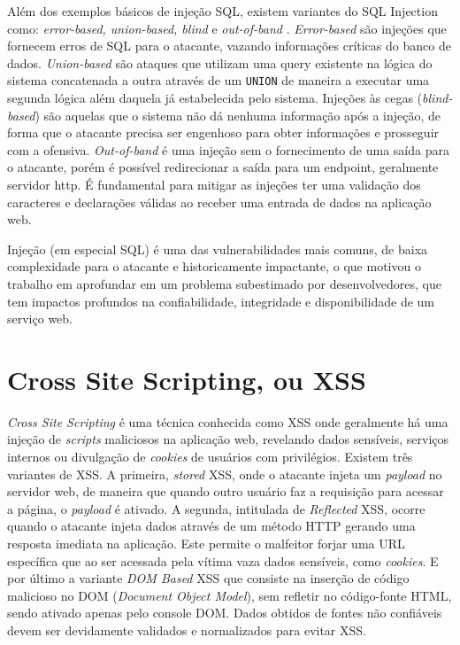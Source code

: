 Além dos exemplos básicos de injeção SQL, existem variantes \cite{bach_owasp2020understanding} do SQL Injection como: \textit{error-based, union-based, blind} e \textit{out-of-band} \cite{out_of_band_sql_invicti}. \textit{Error-based} são injeções que fornecem erros de SQL para o atacante, vazando informações críticas do banco de dados. \textit{Union-based} são ataques que utilizam uma query existente na lógica do sistema concatenada a outra através de um \verb+UNION+ de maneira a executar uma segunda lógica além daquela já estabelecida pelo sistema. Injeções às cegas (\textit{blind-based}) são aquelas que o sistema não dá nenhuma informação após a injeção, de forma que o atacante precisa ser engenhoso para obter informações e prosseguir com a ofensiva. \textit{Out-of-band} é uma injeção sem o fornecimento de uma saída para o atacante, porém é possível redirecionar a saída para um endpoint, geralmente servidor http.
É fundamental para mitigar as injeções ter uma validação dos caracteres e declarações válidas ao receber uma entrada de dados na aplicação web.

Injeção (em especial SQL) é uma das vulnerabilidades mais comuns, de baixa complexidade para o atacante e historicamente impactante, o que motivou o trabalho em aprofundar em um problema subestimado por desenvolvedores, que tem impactos profundos na confiabilidade, integridade e disponibilidade de um serviço web.

\section{Cross Site Scripting, ou XSS}
\textit{Cross Site Scripting} é uma técnica conhecida como XSS onde geralmente há uma injeção de \textit{scripts} maliciosos na aplicação web, revelando dados sensíveis, serviços internos ou divulgação de \textit{cookies} de usuários com privilégios.
Existem três variantes de XSS. A primeira, \textit{stored} XSS, onde o atacante injeta um \textit{payload} no servidor web, de maneira que quando outro usuário faz a requisição para acessar a página, o \textit{payload} é ativado. A segunda, intitulada de \textit{Reflected} XSS, ocorre quando o atacante injeta dados através de um método HTTP gerando uma resposta imediata na aplicação. Este permite o malfeitor forjar uma URL específica que ao ser acessada pela vítima vaza dados sensíveis, como \textit{cookies}. E por último a variante \textit{DOM Based} XSS que consiste na inserção de código malicioso no DOM (\textit{Document Object Model}), sem refletir no código-fonte HTML, sendo ativado apenas pelo console DOM.
Dados obtidos de fontes não confiáveis devem ser devidamente validados e normalizados para evitar XSS.


